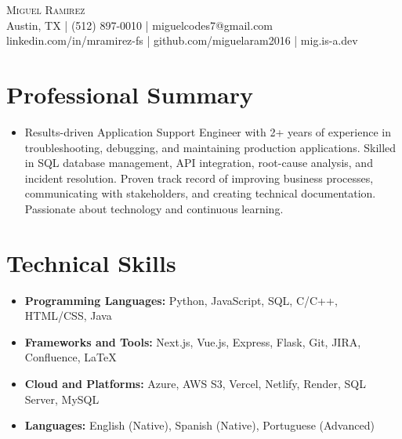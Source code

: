 \documentclass[letterpaper,10pt]{article}
\newcommand{\resumeItem}[1]{\item \small{#1}}
\begin{document}
\begin{center}
  {\Large \scshape Miguel Ramirez} \\ \vspace{0pt}
  Austin, TX | (512) 897-0010 | miguelcodes7@gmail.com \\ 
  linkedin.com/in/mramirez-fs | github.com/miguelaram2016 | mig.is-a.dev
\end{center}

\section*{Professional Summary}
\begin{itemize}
  \resumeItem{Results-driven Application Support Engineer with 2+ years of experience in troubleshooting, debugging, and maintaining production applications. Skilled in SQL database management, API integration, root-cause analysis, and incident resolution. Proven track record of improving business processes, communicating with stakeholders, and creating technical documentation. Passionate about technology and continuous learning.}
\end{itemize}

\section*{Technical Skills}
\begin{itemize}
  \resumeItem{\textbf{Programming Languages:} Python, JavaScript, SQL, C/C++, HTML/CSS, Java}
  \resumeItem{\textbf{Frameworks and Tools:} Next.js, Vue.js, Express, Flask, Git, JIRA, Confluence, LaTeX}
  \resumeItem{\textbf{Cloud and Platforms:} Azure, AWS S3, Vercel, Netlify, Render, SQL Server, MySQL}
  \resumeItem{\textbf{Languages:} English (Native), Spanish (Native), Portuguese (Advanced)}
\end{itemize}

\end{document}

